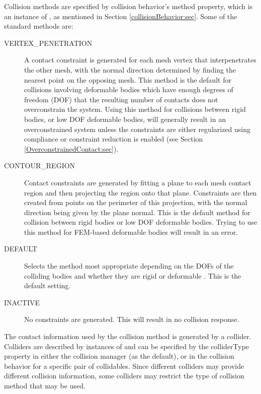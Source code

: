 Collision methods are specified by collision behavior's {\sf method}
property, which is an instance of
, as
mentioned in Section \ref{collisionBehavior:sec}.  Some of the
standard methods are:

\begin{description}

\item[VERTEX\_PENETRATION]\mbox{}

A contact constraint is generated for each mesh vertex that
interpenetrates the other mesh, with the normal direction determined
by finding the nearest point on the opposing mesh.  This method is the
default for collisions involving deformable bodies which have enough
degrees of freedom (DOF) that the resulting number of contacts does
not overconstrain the system.  Using this method for collisions
between rigid bodies, or low DOF deformable bodies, will generally
result in an overconstrained system unless the constraints are either
regularized using compliance or constraint reduction is enabled
(see Section \ref{OverconstrainedContact:sec}).

\item[CONTOUR\_REGION]\mbox{}

Contact constraints are generated by fitting a plane to each mesh
contact region and then projecting the region onto that plane.
Constraints are then created from points on the perimeter of this
projection, with the normal direction being given by the plane
normal. This is the default method for collision between rigid bodies
or low DOF deformable bodies. Trying to use this method for FEM-based
deformable bodies will result in an error.

\item[DEFAULT]\mbox{}

Selects the method most appropriate depending on the DOFs of the
colliding bodies and whether they are rigid or deformable . This is
the default setting.

\item[INACTIVE]\mbox{}

No constraints are generated. This will result in no collision
response.

\end{description}

The contact information used by the collision method is generated by a
collider. Colliders are described by instances of
and can be specified by the {\sf colliderType} property in either the
collision manager (as the default), or in the collision behavior for a
specific pair of collidables. Since different colliders may provide
different collision information, some colliders may restrict the type
of collision method that may be used.

